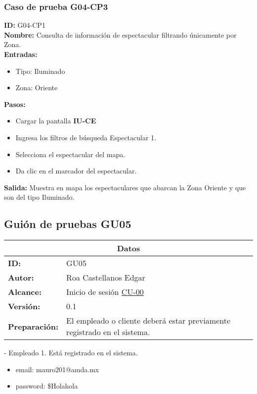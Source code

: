\subsubsection{Caso de prueba G04-CP3}
\textbf{ID:} G04-CP1\\
\textbf{Nombre:} Consulta de información de espectacular filtrando únicamente por Zona.\\
\textbf{Entradas:} 
\begin{itemize}
    \item Tipo: Iluminado
    \item Zona: Oriente
\end{itemize}
\textbf{Pasos:}\\
\begin{itemize}
    \item Cargar la pantalla \textbf{IU-CE}
    \item Ingresa los filtros de búsqueda Espectacular 1.
    \item Selecciona el espectacular del mapa. 
    \item Da clic en el marcador del espectacular.
\end{itemize}
\textbf{Salida:}
Muestra en mapa los espectaculares que abarcan la Zona Oriente y que son del tipo Iluminado.
\clearpage
\subsection{Guión de pruebas GU05}
\begin{table}[htbp]
\centering
\begin{tabular}{| p{5cm}| p{13cm} |} \hline
\multicolumn{2}{|c|}{\textbf{Datos}} \\ \hline
\textbf{ID:}&GU05\\ \hline
\textbf{Autor:}&Roa Castellanos Edgar\\ \hline
\textbf{Alcance:}&Inicio de sesión \hyperlink{CU:CU00}{CU-00}\\ \hline
\textbf {Versión:}&0.1 \\ \hline
\textbf{Preparación:}&El empleado o cliente deberá estar previamente registrado en el sistema.\\ \hline
\end{tabular}
\end{table}

- Empleado 1. Está registrado en el sistema. 
\begin{itemize}
    \item email: mauro201@amda.mx
    \item password: \$Holahola
\end{itemize}

